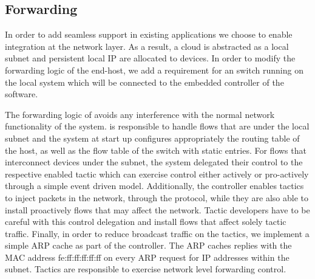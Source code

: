 

\subsection{Forwarding} \label{signpost-forwarding}

In order to add seamless \signpost support in existing applications we choose to
enable \signpost integration at the network layer. As a result, a \signpost
cloud is abstracted as a local subnet and persistent local IP are allocated to
devices. In order to modify the forwarding logic of the end-host, we add a
requirement for an \of switch running on the local system which will be
connected to the embedded \of controller of the \signpost software. 

The forwarding logic of \signpost avoids any interference with the normal
network functionality of the system. \signpost is responsible to handle flows
that are under the \signpost local subnet and the system at start up configures
appropriately the routing table of the host, as well as the \of flow table of
the switch with static entries. For flows that interconnect \signpost devices
under the \signpost subnet, the system delegated their control to the respective
enabled tactic which can exercise control either actively or pro-actively
through a simple event driven model. Additionally, the controller enables
tactics to inject packets in the network, through the \of protocol, while they
are also able to install proactively \of flows that may affect the network.
Tactic developers have to be careful with this control delegation and install
flows that affect solely tactic traffic. Finally, in order to reduce broadcast
traffic on the tactics, we implement a simple ARP cache as part of the \of
controller. The ARP caches replies with the MAC address fe:ff:ff:ff:ff:ff on
every ARP request for IP addresses within the \signpost subnet. Tactics are
responsible to exercise network level forwarding control. 

